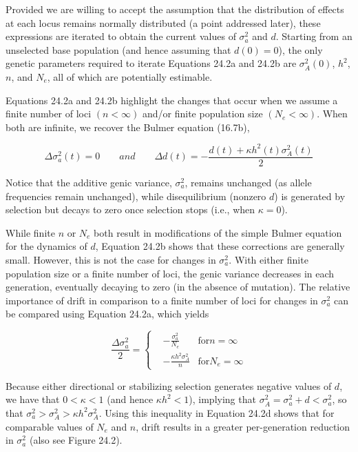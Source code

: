 \documentclass{article}
\begin{document}
Provided we are willing to accept the assumption that the distribution of effects at each locus remains normally distributed (a point addressed later), these expressions are iterated to obtain the current values of  $ \sigma_a^2 $ and  $ d $. Starting from an unselected base population (and hence assuming that  $ d(0) = 0 $), the only genetic parameters required to iterate Equations 24.2a and 24.2b are  $ \sigma_A^2(0) $,  $ h^2 $,  $ n $, and  $ N_e $, all of which are potentially estimable.

Equations 24.2a and 24.2b highlight the changes that occur when we assume a finite number of loci  $ (n < \infty) $ and/or finite population size  $ (N_e < \infty) $. When both are infinite, we recover the Bulmer equation (16.7b),

\begin{equation}
\Delta\sigma_{a}^{2}(t)=0\qquad and\qquad\Delta d(t)=-\frac{d(t)+\kappa h^{2}(t)\sigma_{A}^{2}(t)}{2}
\tag{24.2c}
\label{eq:24_2c}
\end{equation}

Notice that the additive genic variance,  $ \sigma_a^2 $, remains unchanged (as allele frequencies remain unchanged), while disequilibrium (nonzero  $ d $) is generated by selection but decays to zero once selection stops (i.e., when  $ \kappa = 0 $).

While finite $n$ or $N_e$ both result in modifications of the simple Bulmer equation for the dynamics of $d$, Equation 24.2b shows that these corrections are generally small. However, this is not the case for changes in $\sigma_a^2$. With either finite population size or a finite number of loci, the genic variance decreases in each generation, eventually decaying to zero (in the absence of mutation). The relative importance of drift in comparison to a finite number of loci for changes in $\sigma_a^2$ can be compared using Equation 24.2a, which yields

\begin{equation}
\frac{\Delta\sigma_{a}^{2}}{2}=\left\{\begin{aligned}&-\frac{\sigma_{a}^{2}}{N_{e}}&\text{for}n=\infty\\ &-\frac{\kappa h^{2}\sigma_{A}^{2}}{n}&\text{for}N_{e}=\infty\end{aligned}\right.
\tag{24.2d}
\label{eq:24_2d}
\end{equation}

Because either directional or stabilizing selection generates negative values of $d$, we have that $0 < \kappa < 1$ (and hence $\kappa h^2 < 1$), implying that $\sigma_A^2 = \sigma_a^2 + d < \sigma_a^2$, so that $\sigma_a^2 > \sigma_A^2 > \kappa h^2 \sigma_A^2$. Using this inequality in Equation 24.2d shows that for comparable values of $N_e$ and $n$, drift results in a greater per-generation reduction in $\sigma_a^2$ (also see Figure 24.2).
\end{document}
